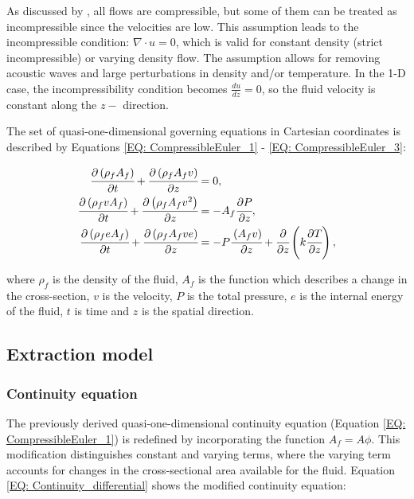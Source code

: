 \documentclass[a4paper,fleqn]{cas-dc}
\begin{document}
	As discussed by \citet{Anderson2023}, all flows are compressible, but some of them can be treated as incompressible since the velocities are low. This assumption leads to the incompressible condition: $\nabla \cdot u =0$, which is valid for constant density (strict incompressible) or varying density flow. The assumption allows for removing acoustic waves and large perturbations in density and/or temperature. In the 1-D case, the incompressibility condition becomes $\frac{du}{dz} = 0$, so the fluid velocity is constant along the $z-$ direction.
	
	The set of quasi-one-dimensional governing equations in Cartesian coordinates is described by Equations \ref{EQ: CompressibleEuler_1} - \ref{EQ: CompressibleEuler_3}:
	
	{\footnotesize
		\begin{align}
			\label{EQ: CompressibleEuler_1}
			\cfrac{\partial \left( \rho_f A_f \right) }{\partial t} + \cfrac{\partial \left( \rho_f A_f v \right)}{\partial z} &= 0, \\
			\cfrac{\partial \left( \rho_f v A_f \right) }{\partial t} + \cfrac{\partial \left( \rho_f A_f v^2 \right)}{\partial z} &= -A_f \cfrac{\partial P}{\partial z} \label{EQ: CompressibleEuler_2}, \\
			\cfrac{\partial \left( \rho_f e A_f \right) }{\partial t} + \cfrac{\partial \left( \rho_f A_f v e\right)}{\partial z} &= -P\cfrac{\left( A_f v \right)}{\partial z} + \cfrac{\partial}{\partial z} \left( k \cfrac{\partial T}{\partial z} \right),   
			\label{EQ: CompressibleEuler_3}
		\end{align}  
	}
	
	where $\rho_f$ is the density of the fluid, $A_f$ is the function which describes a change in the cross-section, $v$ is the velocity, $P$ is the total pressure, $e$ is the internal energy of the fluid, $t$ is time and $z$ is the spatial direction.
	
	\subsection{Extraction model} \label{CH: Extraction_model}
	\subsubsection{Continuity equation} \label{CH: Continuity}
	
	The previously derived quasi-one-dimensional continuity equation (Equation \ref{EQ: CompressibleEuler_1}) is redefined by incorporating the function $A_f = A\phi$. This modification distinguishes constant and varying terms, where the varying term accounts for changes in the cross-sectional area available for the fluid. Equation \ref{EQ: Continuity_differential} shows the modified continuity equation:
	
\end{document}
